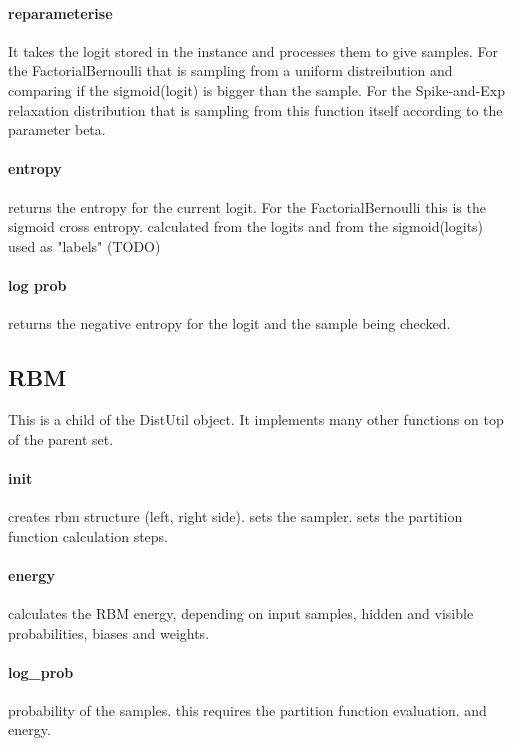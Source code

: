 \paragraph{reparameterise} It takes the logit stored in the instance and
processes them to give samples. For the FactorialBernoulli that is sampling from
a uniform distreibution and comparing if the sigmoid(logit) is bigger than the
sample. For the Spike-and-Exp relaxation distribution that is sampling from this
function itself according to the parameter beta. 

\paragraph{entropy} returns the entropy for the current logit. For the
FactorialBernoulli this is the sigmoid cross entropy. calculated from the logits
and from the sigmoid(logits) used as "labels" (TODO) 

\paragraph{log prob} returns the negative entropy for the logit and the sample
being checked.

\subsection{RBM}
This is a child of the DistUtil object. It implements many other functions on
top of the parent set. \paragraph{init} creates rbm structure (left, right
side). sets the sampler. sets the partition function calculation steps.
\paragraph{energy} calculates the RBM energy, depending on input samples, hidden
and visible probabilities, biases and weights. \paragraph{log\_prob} probability
of the samples. this requires the partition function evaluation. and energy.
